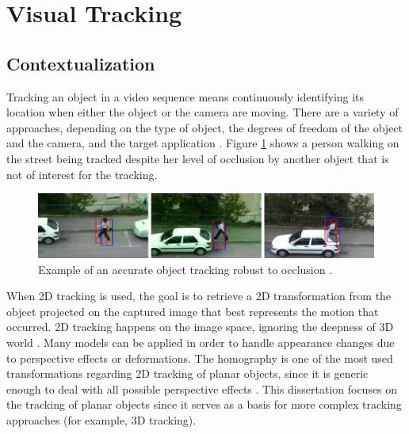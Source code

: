 

\section{Visual Tracking} %
\label{sec:basic_concepts:visual_tracking}

\subsection{Contextualization} %
\label{sub:basic_concepts:visual_tracking:contextualization}

Tracking an object in a video sequence means continuously identifying its location when either the object or the camera are moving. There are a variety of approaches, depending on the type of object, the degrees of freedom of the object and the camera, and the target application \cite{Lepetit2005,Teichrieb2007}. Figure \ref{figure:tracking_occlusion} shows a person walking on the street being tracked despite her level of occlusion by another object that is not of interest for the tracking.

\begin{figure}[!htb]
  \centering
  \includegraphics[width=\linewidth]{chapters/basic_concepts/tracking_occlusion.png}
  \caption{Example of an accurate object tracking robust to occlusion \cite{Jia2012}.}
  \label{figure:tracking_occlusion}
\end{figure}

When 2D tracking is used, the goal is to retrieve a 2D transformation from the object projected on the captured image that best represents the motion that occurred. 2D tracking happens on the image space, ignoring the deepness of 3D world \cite{Li2008}. Many models can be applied in order to handle appearance changes due to perspective effects or deformations. The homography is one of the most used transformations regarding 2D tracking of planar objects, since it is generic enough to deal with all possible perspective effects \cite{CMei2008}. This dissertation focuses on the tracking of planar objects since it serves as a basis for more complex tracking approaches (for example, 3D tracking).

